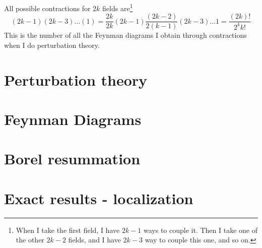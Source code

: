 \documentclass[../main/main.tex]{subfiles}
\begin{document}
All possible contractions for $2k$ fields are\footnote{When I take the first field, I have $2k-1$ ways to couple it. Then I take one of the other $2k-2$ fields, and I have $2k-3$ way to couple this one, and so on.}
\[(2k-1)(2k-3)\dots(1)=\frac{2k}{2k}(2k-1)\frac{(2k-2)}{2(k-1)}(2k-3)\dots1=\frac{(2k)!}{2^kk!}\]
This is the number of all the Feynman diagrams I obtain through contractions when I do perturbation theory. 








\section{Perturbation theory}
\section{Feynman Diagrams}
\section{Borel resummation}
\section{Exact results - localization}
\end{document}
